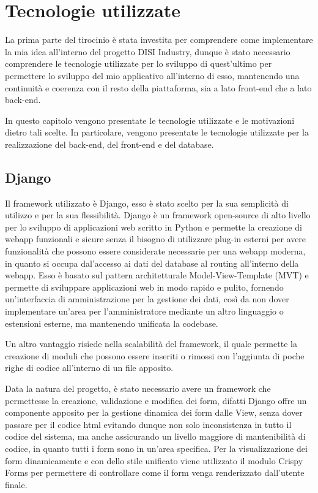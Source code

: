 \chapter{Tecnologie utilizzate}
\label{cha:tecnologie_utilizzate}

La prima parte del tirocinio è stata investita per comprendere come implementare la mia idea all'interno del progetto DISI Industry, dunque è stato necessario comprendere le tecnologie utilizzate per lo sviluppo di quest'ultimo per permettere lo sviluppo del mio applicativo all'interno di esso, mantenendo una continuità e coerenza con il resto della piattaforma, sia a lato front-end che a lato back-end.

In questo capitolo vengono presentate le tecnologie utilizzate e le motivazioni dietro tali scelte. In particolare, vengono presentate le tecnologie utilizzate per la realizzazione del back-end, del front-end e del database.

\section{Django}
Il framework utilizzato è Django, esso è stato scelto per la sua semplicità di utilizzo e per la sua flessibilità. Django è un framework open-source di alto livello per lo sviluppo di applicazioni web scritto in Python e permette la creazione di webapp funzionali e sicure senza il bisogno di utilizzare plug-in esterni per avere funzionalità che possono essere considerate necessarie per una webapp moderna, in quanto si occupa dal'accesso ai dati del database al routing all'interno della webapp. Esso è basato sul pattern architetturale Model-View-Template (MVT) e permette di sviluppare applicazioni web in modo rapido e pulito, fornendo un'interfaccia di amministrazione per la gestione dei dati, così da non dover implementare un'area per l'amministratore mediante un altro linguaggio o estensioni esterne, ma mantenendo unificata la codebase.

Un altro vantaggio risiede nella scalabilità del framework, il quale permette la creazione di moduli che possono essere inseriti o rimossi con l'aggiunta di poche righe di codice all'interno di un file apposito.


Data la natura del progetto, è stato necessario avere un framework che permettesse la creazione, validazione e modifica dei form, difatti Django offre un componente apposito per la gestione dinamica dei form dalle View, senza dover passare per il codice html evitando dunque non solo inconsistenza in tutto il codice del sistema, ma anche assicurando un livello maggiore di mantenibilità di codice, in quanto tutti i form sono in un'area specifica. Per la visualizzazione dei form dinamicamente e con dello stile unificato viene utilizzato il modulo Crispy Forms per permettere di controllare come il form venga renderizzato dall'utente finale. \cite{crispy_forms}


